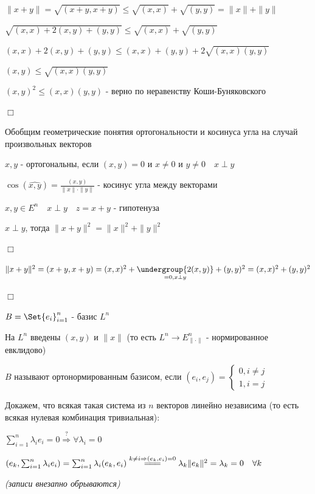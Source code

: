 \documentclass[12pt]{article}
\begin{document}
    $\|x + y\| = \sqrt{(x + y, x + y)} \leq \sqrt{(x, x)} + \sqrt{(y, y)} = \|x\| + \|y\|$

    $\sqrt{(x, x) + 2(x, y) + (y, y)} \leq \sqrt{(x, x)} + \sqrt{(y, y)}$

    $(x, x) + 2(x, y) + (y, y) \leq (x, x) + (y, y) + 2\sqrt{(x, x)(y, y)}$

    $(x, y) \leq \sqrt{(x, x)(y, y)}$

    $(x, y)^2 \leq (x, x)(y, y)$ - верно по неравенству Коши-Буняковского

    $\Box$

    Обобщим геометрические понятия ортогональности и косинуса угла на случай произвольных векторов

    \Def $x, y$ - ортогональны, если $(x, y) = 0$ и $x \neq 0$ и $y \neq 0 \quad x \perp y$

    \Def $\cos(\widehat{x, y}) = \frac{(x, y)}{\|x\|\cdot\|y\|}$ - косинус угла между векторами

    \Def $x, y \in E^n \quad x \perp y \quad z = x + y$ - гипотенуза

    \Th $x \perp y$, тогда $\|x + y\|^2 = \|x\|^2 + \|y\|^2$

    $\Box$

    $\|x + y\|^2 = (x + y, x + y) = (x, x)^2 + \underset{= 0, x \perp y}{\undergroup{2(x, y)}} + (y, y)^2 = (x, x)^2 + (y, y)^2$

    $\Box$

    \Def $B = \Set{e_i}_{i=1}^n$ - базис $L^n$

    На $L^n$ введены $(x, y)$ и $\|x\|$ (то есть $L^n \to E^n_{\|\cdot\|}$ - нормированное евклидово)

    $B$ называют ортонормированным базисом, если $(e_i, e_j) = \begin{cases}0, i \neq j \\ 1, i = j\end{cases}$

    \Nota Докажем, что всякая такая система из $n$ векторов линейно независима (то есть всякая нулевая комбинация тривиальная):

    $\sum_{i=1}^n \lambda_i e_i = 0 \stackrel{?}{\Longrightarrow} \forall \lambda_i = 0$

    $(e_k, \sum_{i=1}^n \lambda_i e_i) = \sum_{i=1}^n \lambda_i (e_k, e_i) \stackrel{k \neq i \Rightarrow (e_k, e_i) = 0}{=\joinrel=\joinrel=}
    \lambda_k \|e_k\|^2 = \lambda_k = 0 \quad \forall k$



    \textit{(записи внезапно обрываются)}
\end{document}
